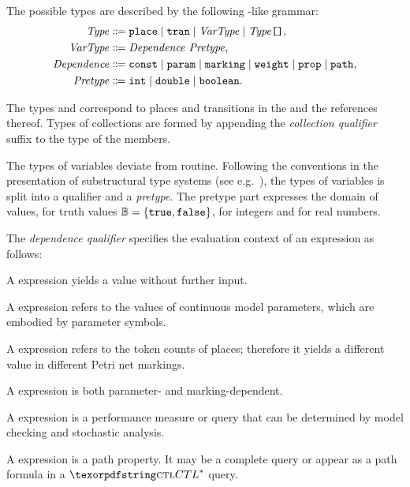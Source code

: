 The possible types are described by the following -like grammar:
\begin{equation}
  \begin{aligned}
    \ebnfVar{Type} &\ebnfEq \lit{place} \mid \lit{tran} \mid \ebnfVar{VarType} \mid \bagtype{\ebnfVar{Type}} \text, \\
    \ebnfVar{VarType} &\ebnfEq \vartype{\ebnfVar{Dependence}}{\ebnfVar{Pretype}} \text,\\
    \rel{Dependence} &\ebnfEq \lit{const} \mid \lit{param} \mid \lit{marking} \mid \lit{weight} \mid \lit{prop} \mid \lit{path} \text, \\
    \ebnfVar{Pretype} &\ebnfEq \lit{int} \mid \lit{double} \mid \lit{boolean} \text.
  \end{aligned} \label{eq:rgspn:type-ebnf}
\end{equation}

The types  and  correspond to places and transitions in the  and the references thereof. Types of collections are formed by appending the \emph{collection qualifier} suffix \lit{[]} to the type of the members.

The types of variables deviate from routine. Following the conventions in the presentation of substructural type systems (see e.g.~\cite{Walker05substructural}), the types of variables is split into a qualifier and a \emph{pretype}. The pretype part expresses the domain of values,  for truth values \(\mathbb{B} = \{\texttt{\upshape true}, \texttt{\upshape false}\}\),  for integers and  for real numbers.

The \emph{dependence qualifier} specifies the evaluation context of an expression as follows:
\begin{compactitem}
\item A  expression yields a value without further input.
\item A  expression refers to the values of continuous model parameters, which are embodied by parameter symbols.
\item A  expression refers to the token counts of places; therefore it yields a different value in different Petri net markings.
\item A  expression is both parameter- and marking-dependent.
\item A  expression is a performance measure or query that can be determined by model checking and stochastic analysis.
\item A  expression is a path property. It may be a complete  query or appear as a path formula in a \(\textabbr{CTL}^*\)  query.
\end{compactitem}

